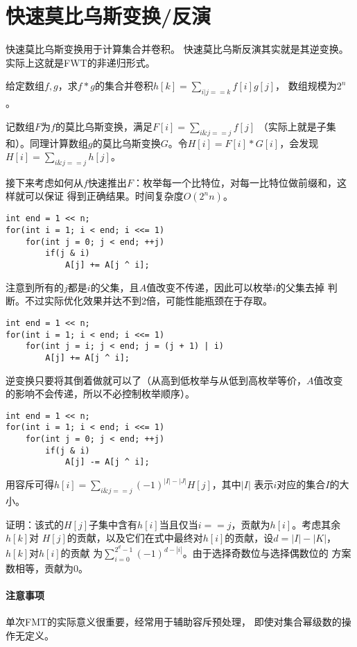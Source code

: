\section{快速莫比乌斯变换/反演}\label{FMT}
快速莫比乌斯变换用于计算集合并卷积。
快速莫比乌斯反演其实就是其逆变换。
实际上这就是FWT的非递归形式。

给定数组$f,g$，求$f*g$的集合并卷积$\displaystyle h[k]=\sum_{i|j==k}{f[i]g[j]}$，
数组规模为$2^n$。

记数组$F$为$f$的莫比乌斯变换，满足$\displaystyle F[i]=\sum_{i\&j==j}{f[j]}$
（实际上就是子集和）。同理计算数组$g$的莫比乌斯变换$G$。令$H[i]=F[i]*G[i]$，会发现
$\displaystyle H[i]=\sum_{i\&j==j}{h[j]}$。

接下来考虑如何从$f$快速推出$F$：枚举每一个比特位，对每一比特位做前缀和，这样就可以保证
得到正确结果。时间复杂度$O(2^nn)$。
\begin{lstlisting}
int end = 1 << n;
for(int i = 1; i < end; i <<= 1)
    for(int j = 0; j < end; ++j)
        if(j & i)
            A[j] += A[j ^ i];
\end{lstlisting}

注意到所有的$j$都是$i$的父集，且$A$值改变不传递，因此可以枚举$i$的父集去掉
判断。不过实际优化效果并达不到2倍，可能性能瓶颈在于存取。

\begin{lstlisting}
int end = 1 << n;
for(int i = 1; i < end; i <<= 1)
    for(int j = i; j < end; j = (j + 1) | i)
        A[j] += A[j ^ i];
\end{lstlisting}

逆变换只要将其倒着做就可以了（从高到低枚举与从低到高枚举等价，$A$值改变
的影响不会传递，所以不必控制枚举顺序）。
\begin{lstlisting}
int end = 1 << n;
for(int i = 1; i < end; i <<= 1)
    for(int j = 0; j < end; ++j)
        if(j & i)
            A[j] -= A[j ^ i];
\end{lstlisting}

用容斥可得$\displaystyle h[i]=\sum_{i\&j==j}{(-1)^{|I|-|J|}H[j]}$，其中$|I|$
表示$i$对应的集合$I$的大小。

证明：该式的$H[j]$子集中含有$h[i]$当且仅当$i==j$，贡献为$h[i]$。考虑其余$h[k]$对
$H[j]$的贡献，以及它们在式中最终对$h[i]$的贡献，设$d=|I|-|K|$，$h[k]$对$h[i]$的贡献
为$\displaystyle \sum_{i=0}^{2^d-1}{(-1)^{d-|i|}}$。由于选择奇数位与选择偶数位的
方案数相等，贡献为0。

\paragraph{注意事项} 单次FMT的实际意义很重要，经常用于辅助容斥预处理，
即使对集合幂级数的操作无定义。

